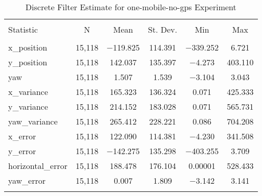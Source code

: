 
\begin{table}[h] \centering 
  \caption{Discrete Filter Estimate for one-mobile-no-gps Experiment} 
  \label{tab:one_mobile_no_gps_discrete_summary} 
\begin{tabular}{@{\extracolsep{5pt}}lccccc} 
\\[-1.8ex]\hline 
\hline \\[-1.8ex] 
Statistic & \multicolumn{1}{c}{N} & \multicolumn{1}{c}{Mean} & \multicolumn{1}{c}{St. Dev.} & \multicolumn{1}{c}{Min} & \multicolumn{1}{c}{Max} \\ 
\hline \\[-1.8ex] 
x\_position & 15,118 & $-$119.825 & 114.391 & $-$339.252 & 6.721 \\ 
y\_position & 15,118 & 142.037 & 135.397 & $-$4.273 & 403.110 \\ 
yaw & 15,118 & 1.507 & 1.539 & $-$3.104 & 3.043 \\ 
x\_variance & 15,118 & 165.323 & 136.324 & 0.071 & 425.333 \\ 
y\_variance & 15,118 & 214.152 & 183.028 & 0.071 & 565.731 \\ 
yaw\_variance & 15,118 & 265.412 & 228.221 & 0.086 & 704.208 \\ 
x\_error & 15,118 & 122.090 & 114.381 & $-$4.230 & 341.508 \\ 
y\_error & 15,118 & $-$142.275 & 135.298 & $-$403.255 & 3.709 \\ 
horizontal\_error & 15,118 & 188.478 & 176.104 & 0.00001 & 528.433 \\ 
yaw\_error & 15,118 & 0.007 & 1.809 & $-$3.142 & 3.141 \\ 
\hline \\[-1.8ex] 
\end{tabular} 
\end{table} 
